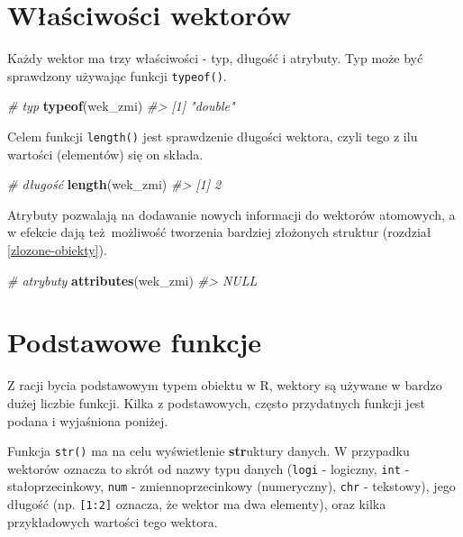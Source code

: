 \documentclass[paper=6in:9in,pagesize=pdftex,headinclude=on,footinclude=on,10pt]{scrbook}
\newenvironment{Shaded}{\begin{snugshade}}{\end{snugshade}}
\newcommand{\CommentTok}[1]{\textcolor[rgb]{0.56,0.35,0.01}{\textit{#1}}}
\newcommand{\KeywordTok}[1]{\textcolor[rgb]{0.13,0.29,0.53}{\textbf{#1}}}
\newcommand{\NormalTok}[1]{#1}
\begin{document}
\hypertarget{wux142aux15bciwoux15bci-wektoruxf3w}{%
\section{Właściwości wektorów}\label{wux142aux15bciwoux15bci-wektoruxf3w}}

Każdy wektor ma trzy właściwości - typ, długość i atrybuty.
Typ może być sprawdzony używając funkcji \texttt{typeof()}.

\begin{Shaded}
\begin{Highlighting}[]
\CommentTok{# typ}
\KeywordTok{typeof}\NormalTok{(wek_zmi)}
\CommentTok{#> [1] "double"}
\end{Highlighting}
\end{Shaded}

Celem funkcji \texttt{length()} jest sprawdzenie długości wektora, czyli tego z ilu wartości (elementów) się on składa.

\begin{Shaded}
\begin{Highlighting}[]
\CommentTok{# długość}
\KeywordTok{length}\NormalTok{(wek_zmi)}
\CommentTok{#> [1] 2}
\end{Highlighting}
\end{Shaded}

Atrybuty pozwalają na dodawanie nowych informacji do wektorów atomowych, a w efekcie dają też~możliwość tworzenia bardziej złożonych struktur (rozdział \ref{zlozone-obiekty}).

\begin{Shaded}
\begin{Highlighting}[]
\CommentTok{# atrybuty}
\KeywordTok{attributes}\NormalTok{(wek_zmi)}
\CommentTok{#> NULL}
\end{Highlighting}
\end{Shaded}

\hypertarget{pf-vector}{%
\section{Podstawowe funkcje}\label{pf-vector}}

Z racji bycia podstawowym typem obiektu w R, wektory są używane w bardzo dużej liczbie funkcji.
Kilka z podstawowych, często przydatnych funkcji jest podana i wyjaśniona poniżej.

Funkcja \texttt{str()} ma na celu wyświetlenie \textbf{str}uktury danych.
W przypadku wektorów oznacza to skrót od nazwy typu danych (\texttt{logi} - logiczny, \texttt{int} - stałoprzecinkowy, \texttt{num} - zmiennoprzecinkowy (numeryczny), \texttt{chr} - tekstowy), jego długość (np. \texttt{{[}1:2{]}} oznacza, że wektor ma dwa elementy), oraz kilka przykładowych wartości tego wektora.
\end{document}
